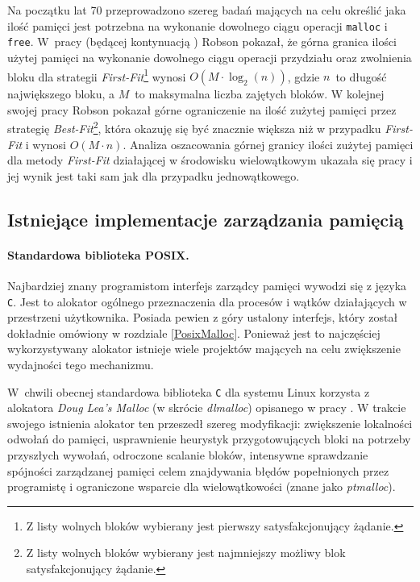 \documentclass[12pt,a4paper,titlepage,twoside]{mwart}
\begin{document}
Na początku lat 70 przeprowadzono szereg badań mających na celu określić jaka
ilość pamięci jest potrzebna na wykonanie dowolnego ciągu operacji
\texttt{malloc} i \texttt{free}. W~pracy \cite{robson74bounds} (będącej
kontynuacją \cite{robson71estimate}) Robson pokazał, że górna granica ilości
użytej pamięci na wykonanie dowolnego ciągu operacji przydziału oraz zwolnienia
bloku dla strategii \textit{First-Fit}\footnote{Z listy wolnych bloków
wybierany jest pierwszy satysfakcjonujący żądanie.} wynosi $O(M \cdot
\log_{2}(n))$, gdzie $n$~to długość największego bloku, a $M$~to maksymalna
liczba zajętych bloków. W kolejnej swojej pracy \cite{robson77worst} Robson
pokazał górne ograniczenie na ilość zużytej pamięci przez strategię
\textit{Best-Fit}\footnote{Z listy wolnych bloków wybierany jest najmniejszy
możliwy blok satysfakcjonujący żądanie.}, która okazuję się być znacznie
większa niż w przypadku \textit{First-Fit} i wynosi $O(M \cdot n)$. Analiza
oszacowania górnej granicy ilości zużytej pamięci dla metody \textit{First-Fit}
działającej w środowisku wielowątkowym ukazała się pracy \cite{luby94tight} i
jej wynik jest taki sam jak dla przypadku jednowątkowego.

\subsection{Istniejące implementacje zarządzania pamięcią}

\paragraph{Standardowa biblioteka POSIX.}

Najbardziej znany programistom interfejs zarządcy pamięci wywodzi się z języka
\verb+C+. Jest to alokator ogólnego przeznaczenia dla procesów i wątków
działających w przestrzeni użytkownika. Posiada pewien z góry ustalony
interfejs, który został dokładnie omówiony w rozdziale \ref{PosixMalloc}.
Ponieważ jest to najczęściej wykorzystywany alokator istnieje wiele projektów
mających na celu zwiększenie wydajności tego mechanizmu.

W~chwili obecnej standardowa biblioteka \verb+C+ dla systemu Linux korzysta z
alokatora \textit{Doug Lea's Malloc} (w skrócie \textit{dlmalloc}) opisanego w
pracy \cite{douglea96malloc}. W trakcie swojego istnienia alokator ten
przeszedł szereg modyfikacji: zwiększenie lokalności odwołań do pamięci,
usprawnienie heurystyk przygotowujących bloki na potrzeby przyszłych wywołań,
odroczone scalanie bloków, intensywne sprawdzanie spójności zarządzanej pamięci
celem znajdywania błędów popełnionych przez programistę i ograniczone wsparcie
dla wielowątkowości (znane jako \textit{ptmalloc}).
\end{document}
